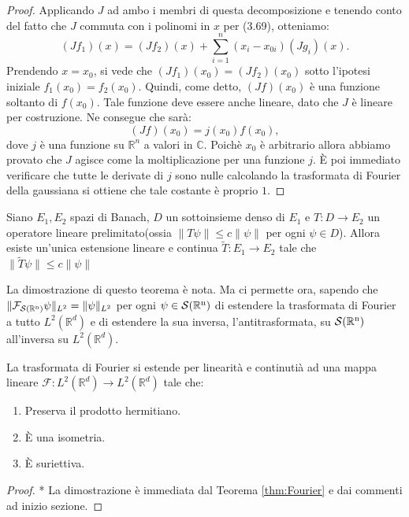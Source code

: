 \begin{proof}
Applicando $J$ ad ambo i membri di questa decomposizione e tenendo conto del fatto che $J$ commuta con i polinomi in ${x}$ per (3.69), otteniamo:
\begin{equation*}
(Jf_1)({x}) = (Jf_2)({x}) + \sum_{i=1}^n (x_i - x_{0i}) (Jg_i)({x}).
\end{equation*}
Prendendo ${x} = {x}_0$, si vede che $(Jf_1)({x}_0) = (Jf_2)({x}_0)$ sotto l'ipotesi iniziale $f_1({x}_0) = f_2({x}_0)$. Quindi, come detto, $(Jf)({x}_0)$ è una funzione soltanto di $f({x}_0)$. Tale funzione deve essere anche lineare, dato che $J$ è lineare per costruzione. Ne consegue che sarà:
\begin{equation*}
(Jf)({x}_0) = j({x}_0) f({x}_0),
\end{equation*}
dove $j$ è una funzione su $\mathbb{R}^n$ a valori in $\mathbb{C}$. Poichè $x_0$ è arbitrario allora abbiamo provato che $J$ agisce come la moltiplicazione per una funzione $j$. È poi immediato verificare che tutte le derivate di $j$ sono nulle calcolando la trasformata di Fourier della gaussiana si ottiene che tale costante è proprio $1$.

\end{proof}

\begin{theorem}
    Siano $E_1, E_2$ spazi di Banach, $D$ un sottoinsieme denso di $E_1$ e $T: D \to E_2$ un operatore lineare prelimitato(ossia $\|T\psi\| \leq c \|\psi\|$ per ogni $\psi \in D$). Allora esiste un'unica estensione lineare e continua $\tilde{T}: E_1 \to E_2$ tale che $\|\tilde{T}\psi\| \leq c \|\psi\|$ 
\end{theorem}

La dimostrazione di questo teorema è nota. Ma ci permette ora, sapendo che $\|\mathcal{F}_{\operatorname{\mathcal{S}(\mathbb{R}^n)}} \psi \|_{L^2} = \|\psi\|_{L^2}$ per ogni $\psi \in \operatorname{\mathcal{S}(\mathbb{R}^n)}$ di estendere la trasformata di Fourier a tutto $L^2(\mathbb{R}^d)$ e di estendere la sua inversa, l'antitrasformata, su $\operatorname{\mathcal{S}(\mathbb{R}^n)}$ all'inversa su $L^2(\mathbb{R}^d)$.

\begin{theorem}
    La trasformata di Fourier si estende per linearità e continutià ad una mappa lineare $\mathcal{F} : L^2(\mathbb{R}^d) \to L^2(\mathbb{R}^d)$ tale che: 
\begin{enumerate}
    \item Preserva il prodotto hermitiano.
    \item È una isometria.
    \item È suriettiva.
\end{enumerate}
\end{theorem}
\begin{proof}* 
    La dimostrazione è immediata dal Teorema \ref{thm:Fourier} e dai commenti ad inizio sezione.
\end{proof}


